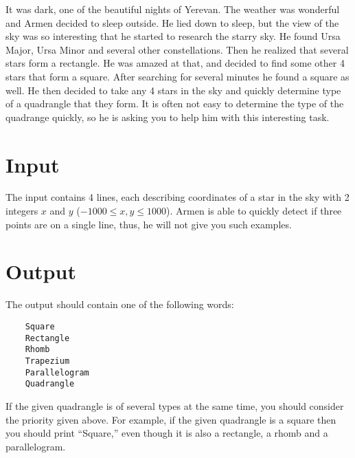
It was dark, one of the beautiful nights of Yerevan.
The weather was wonderful and Armen decided to sleep outside.
He lied down to sleep, but the view of the sky was so interesting that he started to research the starry sky.
He found Ursa Major, Ursa Minor and several other constellations.
Then he realized that several stars form a rectangle.
He was amazed at that, and decided to find some other 4 stars that form a square.
After searching for several minutes he found a square as well.
He then decided to take any 4 stars in the sky and quickly determine type of a quadrangle that they form.
It is often not easy to determine the type of the quadrange quickly, so he is asking you to help him with this interesting task.

\section*{Input}
The input contains 4 lines, each describing coordinates of a star in the sky with 2 integers $x$ and $y$ ($-1000 \leq x, y \leq 1000$).
Armen is able to quickly detect if three points are on a single line, thus, he will not give you such examples.

\section*{Output}
The output should contain one of the following words:
\begin{verbatim}
    Square
    Rectangle
    Rhomb
    Trapezium
    Parallelogram
    Quadrangle
\end{verbatim}
If the given quadrangle is of several types at the same time, you should consider the priority given above.
For example, if the given quadrangle is a square then you should print ``Square,'' even though it is also a rectangle, a rhomb and a parallelogram.
